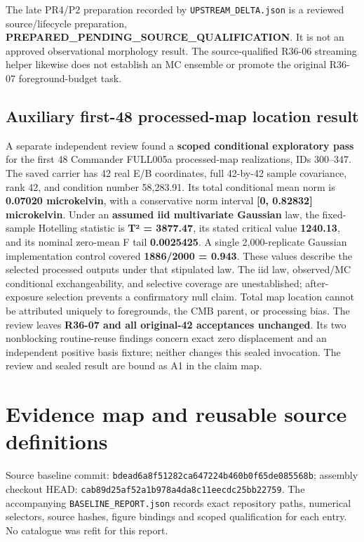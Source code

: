\documentclass[
  10pt,
]{article}
\begin{document}
The late PR4/P2 preparation recorded by \texttt{UPSTREAM\_DELTA.json} is
a reviewed source/lifecycle preparation,
\textbf{PREPARED\_PENDING\_SOURCE\_QUALIFICATION}. It is not an approved
observational morphology result. The source-qualified R36-06 streaming
helper likewise does not establish an MC ensemble or promote the
original R36-07 foreground-budget task.

\hypertarget{auxiliary-first-48-processed-map-location-result}{%
\subsection{Auxiliary first-48 processed-map location
result}\label{auxiliary-first-48-processed-map-location-result}}

A separate independent review found a \textbf{scoped conditional
exploratory pass} for the first 48 Commander FULL005a processed-map
realizations, IDs 300--347. The saved carrier has 42 real E/B
coordinates, full 42-by-42 sample covariance, rank 42, and condition
number 58,283.91. Its total conditional mean norm is \textbf{0.07020
microkelvin}, with a conservative norm interval \textbf{{[}0, 0.82832{]}
microkelvin}. Under an \textbf{assumed iid multivariate Gaussian} law,
the fixed-sample Hotelling statistic is \textbf{T² = 3877.47}, its
stated critical value \textbf{1240.13}, and its nominal zero-mean F tail
\textbf{0.0025425}. A single 2,000-replicate Gaussian implementation
control covered \textbf{1886/2000 = 0.943}. These values describe the
selected processed outputs under that stipulated law. The iid law,
observed/MC conditional exchangeability, and selective coverage are
unestablished; after-exposure selection prevents a confirmatory null
claim. Total map location cannot be attributed uniquely to foregrounds,
the CMB parent, or processing bias. The review leaves \textbf{R36-07 and
all original-42 acceptances unchanged}. Its two nonblocking
routine-reuse findings concern exact zero displacement and an
independent positive basis fixture; neither changes this sealed
invocation. The review and sealed result are bound as A1 in the claim
map.

\hypertarget{evidence-map-and-reusable-source-definitions}{%
\section{Evidence map and reusable source
definitions}\label{evidence-map-and-reusable-source-definitions}}

Source baseline commit:
\texttt{bdead6a8f51282ca647224b460b0f65de085568b}; assembly checkout
HEAD: \texttt{cab89d25af52a1b978a4da8c11eecdc25bb22759}. The
accompanying \texttt{BASELINE\_REPORT.json} records exact repository
paths, numerical selectors, source hashes, figure bindings and scoped
qualification for each entry. No catalogue was refit for this report.
\end{document}

